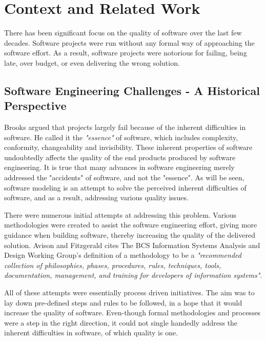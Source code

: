 
\section{Context and Related Work}
\label{sec:contextualization}
There has been significant focus on the quality of software over the last few decades. Software projects were run without any formal way of approaching the software effort. As a result, software projects were notorious for failing, being late, over budget, or even delivering the wrong solution.


\subsection{Software Engineering Challenges - A Historical Perspective} Brooks \cite{brooks_1987:noSilverBullet} argued that projects largely fail because of the inherent difficulties in software. He called it the {\it"essence"} of software, which includes complexity, conformity, changeability and invisibility. These inherent properties of software undoubtedly affects the quality of the end products produced by software engineering. It is true that many advances in software engineering merely addressed the "accidents" of software, and not the "essence". As will be seen, software modeling is an attempt to solve the perceived inherent difficulties of software, and as a result, addressing various quality issues.

There were numerous initial attempts at addressing this problem. Various methodologies were created to assist the software engineering effort, giving more guidance when building software, thereby increasing the quality of the delivered solution. Avison and Fitzgerald \cite{avison_1988:informationSystemsDevelopment} cites The BCS Information Systems Analysis and Design Working Group's definition of a methodology to be a {\it"recommended collection of philosophies, phases, procedures, rules, techniques, tools, documentation, management, and training for developers of information systems"}.

All of these attempts were essentially process driven initiatives. The aim was to lay down pre-defined steps and rules to be followed, in a hope that it would increase the quality of software. Even-though formal methodologies and processes were a step in the right direction, it could not single handedly address the inherent difficulties in software, of which quality is one.

